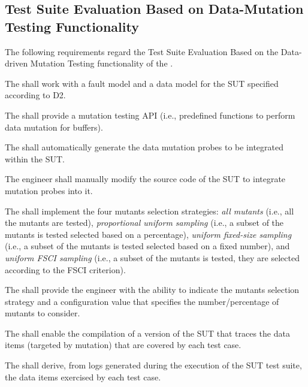 
\subsection{Test Suite Evaluation Based on Data-Mutation Testing Functionality}
\label{sec:dataDriven}

The following requirements regard the Test Suite Evaluation Based on the Data-driven Mutation Testing functionality of the \FAQAS.

\RQ{} The \FAQAS shall work with a fault model and a data model for the SUT specified according to D2.

\RQ{} The \FAQAS shall provide a mutation testing API (i.e., predefined functions to perform data mutation for buffers).

\RQ{} The \FAQAS shall automatically generate the data mutation probes to be integrated within the SUT.

\RQ{} The engineer shall manually modify the source code of the SUT to integrate mutation probes into it.

%

\RQ{} The \FAQAS shall implement the four mutants selection strategies: \emph{all mutants} (i.e., all the mutants are tested), \emph{proportional uniform sampling} (i.e., a subset of the mutants is tested selected based on a percentage), \emph{uniform fixed-size sampling} (i.e., a subset of the mutants is tested selected based on a fixed number), and \emph{uniform FSCI sampling} (i.e., a subset of the mutants is tested, they are selected according to the FSCI criterion).

\RQ{} The \FAQAS shall provide the engineer with the ability to indicate the mutants selection strategy and a configuration value that specifies the number/percentage of mutants to consider.

\RQ{} The \FAQAS shall enable the compilation of a version of the SUT that traces the data items (targeted by mutation) that are covered by each test case.

\RQ{} The \FAQAS shall derive, from logs generated during the execution of the SUT test suite, the data items exercised by each test case.

